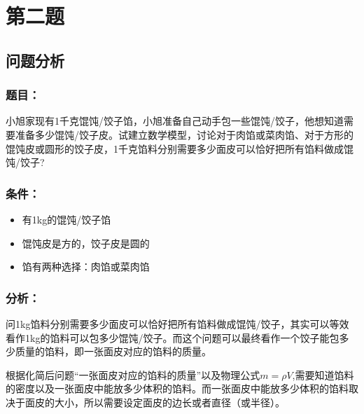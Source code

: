 \documentclass[lang=cn,a4paper]{elegantpaper}
\begin{document}
    \clearpage

    \section{第二题}
    \subsection{问题分析}
    \subsubsection*{题目：}
    小旭家现有1千克馄饨/饺子馅，小旭准备自己动手包一些馄饨/饺子，他想知道需要准备多少馄饨/饺子皮。试建立数学模型，讨论对于肉馅或菜肉馅、对于方形的馄饨皮或圆形的饺子皮，1千克馅料分别需要多少面皮可以恰好把所有馅料做成馄饨/饺子?
    \subsubsection*{条件：}
    \begin{itemize}
        \item 有1kg的馄饨/饺子馅
        \item 馄饨皮是方的，饺子皮是圆的
        \item 馅有两种选择：肉馅或菜肉馅
    \end{itemize}
    \subsubsection*{分析：}
    问1kg馅料分别需要多少面皮可以恰好把所有馅料做成馄饨/饺子，其实可以等效看作1kg的馅料可以包多少馄饨/饺子。而这个问题可以最终看作一个饺子能包多少质量的馅料，即一张面皮对应的馅料的质量。

    根据化简后问题“一张面皮对应的馅料的质量”以及物理公式$m=\rho V$,需要知道馅料的密度以及一张面皮中能放多少体积的馅料。而一张面皮中能放多少体积的馅料取决于面皮的大小，所以需要设定面皮的边长或者直径（或半径）。
\end{document}
